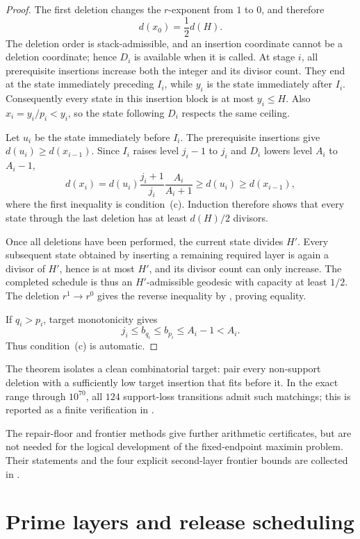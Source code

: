 \documentclass[11pt]{article}
\numberwithin{equation}{section}
\theoremstyle{blueplain}
\theoremstyle{bluedef}
\begin{document}
\begin{proof}
The first deletion changes the $r$-exponent from $1$ to $0$, and therefore
\[
 d(x_0)=\frac12d(H).
\]
The deletion order is stack-admissible, and an insertion coordinate cannot be a deletion coordinate; hence $D_i$ is available when it is called.  At stage $i$, all prerequisite insertions increase both the integer and its divisor count.  They end at the state immediately preceding $I_i$, while $y_i$ is the state immediately after $I_i$.  Consequently every state in this insertion block is at most $y_i\le H$.  Also $x_i=y_i/p_i<y_i$, so the state following $D_i$ respects the same ceiling.

Let $u_i$ be the state immediately before $I_i$.  The prerequisite insertions give $d(u_i)\ge d(x_{i-1})$.  Since $I_i$ raises level $j_i-1$ to $j_i$ and $D_i$ lowers level $A_i$ to $A_i-1$,
\[
 d(x_i)
 =d(u_i)\frac{j_i+1}{j_i}\frac{A_i}{A_i+1}
 \ge d(u_i)
 \ge d(x_{i-1}),
\]
where the first inequality is condition~\textup{(c)}.  Induction therefore shows that every state through the last deletion has at least $d(H)/2$ divisors.

Once all deletions have been performed, the current state divides $H'$.  Every subsequent state obtained by inserting a remaining required layer is again a divisor of $H'$, hence is at most $H'$, and its divisor count can only increase.  The completed schedule is thus an $H'$-admissible geodesic with capacity at least $1/2$.  The deletion $r^1\to r^0$ gives the reverse inequality by , proving equality.

If $q_i>p_i$, target monotonicity gives
\[
 j_i\le b_{q_i}\le b_{p_i}\le A_i-1<A_i.
\]
Thus condition~\textup{(c)} is automatic.
\end{proof}

The theorem isolates a clean combinatorial target: pair every non-support deletion with a sufficiently low target insertion that fits before it.  In the exact range through $10^{70}$, all $124$ support-loss transitions admit such matchings; this is reported as a finite verification in .


The repair-floor and frontier methods give further arithmetic certificates, but are not needed for the logical development of the fixed-endpoint maximin problem.  Their statements and the four explicit second-layer frontier bounds are collected in .

\section{Prime layers and release scheduling}
\label{sec:scheduling}
\end{document}
